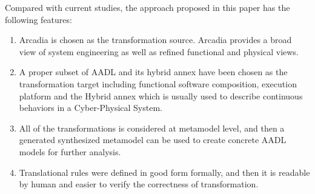 Compared with current studies, the approach proposed in this paper has the following features:
\begin{enumerate}
    \item Arcadia is chosen as the transformation source. Arcadia provides a broad view of system engineering as well as refined functional and physical views.
    \item A proper subset of AADL and its hybrid annex have been chosen as the transformation target including functional software composition, execution platform and the Hybrid annex which is usually used to describe continuous behaviors in a Cyber-Physical System.
    \item All of the transformations is considered at metamodel level, and then a generated synthesized metamodel can be used to create concrete AADL models for further analysis.     
    \item Translational rules were defined in good form formally, and then it is readable by human and easier to verify the correctness of transformation.
\end{enumerate}

